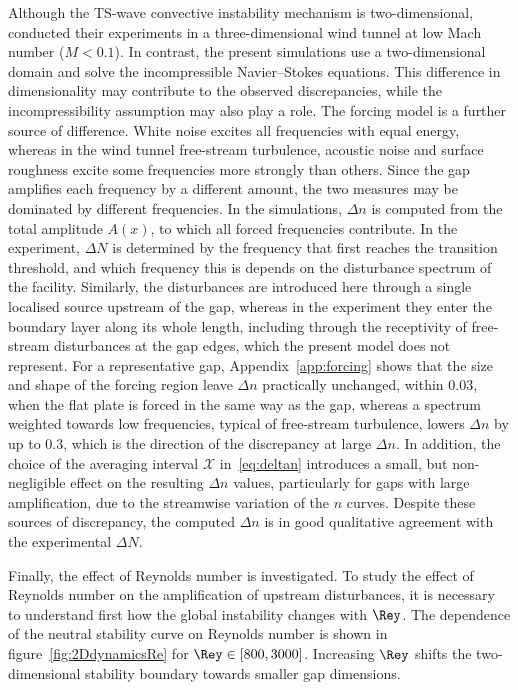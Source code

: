 \documentclass[lineno]{jfm}
\begin{document}
Although the \ac{TS}-wave convective instability mechanism is two-dimensional, \citet{jeffGaps} conducted their experiments in a three-dimensional wind tunnel at low Mach number ($M<0.1$). In contrast, the present simulations use a two-dimensional domain and solve the incompressible Navier--Stokes equations. This difference in dimensionality may contribute to the observed discrepancies, while the incompressibility assumption may also play a role. The forcing model is a further source of difference. White noise excites all frequencies with equal energy, whereas in the wind tunnel free-stream turbulence, acoustic noise and surface roughness excite some frequencies more strongly than others. Since the gap amplifies each frequency by a different amount, the two measures may be dominated by different frequencies. In the simulations, $\Delta n$ is computed from the total amplitude $A(x)$, to which all forced frequencies contribute. In the experiment, $\Delta N$ is determined by the frequency that first reaches the transition threshold, and which frequency this is depends on the disturbance spectrum of the facility. Similarly, the disturbances are introduced here through a single localised source upstream of the gap, whereas in the experiment they enter the boundary layer along its whole length, including through the receptivity of free-stream disturbances at the gap edges, which the present model does not represent. For a representative gap, Appendix~\ref{app:forcing} shows that the size and shape of the forcing region leave $\Delta n$ practically unchanged, within $0.03$, when the flat plate is forced in the same way as the gap, whereas a spectrum weighted towards low frequencies, typical of free-stream turbulence, lowers $\Delta n$ by up to $0.3$, which is the direction of the discrepancy at large $\Delta n$. In addition, the choice of the averaging interval $\mathcal{X}$ in~\eqref{eq:deltan} introduces a small, but non-negligible effect on the resulting $\Delta n$ values, particularly for gaps with large amplification, due to the streamwise variation of the $n$ curves. Despite these sources of discrepancy, the computed $\Delta n$ is in good qualitative agreement with the experimental $\Delta N$.%

Finally, the effect of Reynolds number is investigated. To study the effect of Reynolds number on the amplification of upstream disturbances, it is necessary to understand first how the global instability changes with $\Rey$. The dependence of the neutral stability curve on Reynolds number is shown in figure~\ref{fig:2DdynamicsRe} for $\Rey\in[800,3000]$. Increasing $\Rey$ shifts the two-dimensional stability boundary towards smaller gap dimensions. 
\end{document}
